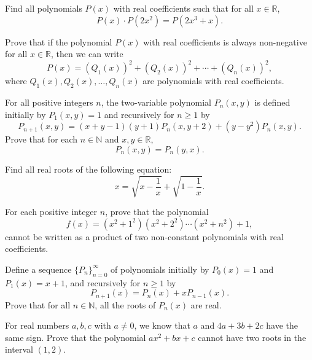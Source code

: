 \begin{question}[name={1979 Bulgaria}]
    Find all polynomials $P(x)$ with real coefficients such that for all $x \in\mathbb R$,
    \[P(x) \cdot P(2x^2) = P(2x^3+x).\]
\end{question}


\begin{question}[name={1979 Hungary}]
    Prove that if the polynomial $P(x)$ with real coefficients is always non-negative for all $x\in\mathbb R$, then we can write
    \[P(x) = (Q_1(x))^2+(Q_2(x))^2+\cdots+(Q_n(x))^2,\]
    where $Q_1(x), Q_2(x), \dots, Q_n(x)$ are polynomials with real coefficients.
\end{question}


\begin{question}[name={1998 Bulgaria}]
    For all positive integers $n$, the two-variable polynomial $P_n(x,y)$ is defined initially by $P_1(x,y)=1$ and recursively for $n\geq 1$ by
    \[P_{n+1}(x,y) = (x+y-1)(y+1)P_n(x,y+2) + (y-y^2)P_n(x,y).\]
    Prove that for each $n\in\mathbb N$ and $x,y \in \mathbb R$,
    \[P_n(x,y) = P_n(y,x).\]
\end{question}



\begin{question}[name={1998 Canada}]
    Find all real roots of the following equation:
    \[x = \sqrt{x-\frac{1}{x}}+\sqrt{1-\frac{1}{x}}.\]
\end{question}

\begin{question}[name={1999 Japan}]
    For each positive integer $n$, prove that the polynomial
    \[f(x)=(x^2+1^2)(x^2+2^2)\cdots (x^2+n^2) + 1,\]
    cannot be written as a product of two non-constant polynomials with real coefficients.
\end{question}

\begin{question}
    Define a sequence $\{P_n\}_{n=0}^\infty$ of polynomials initially by $P_0(x)=1$ and $P_1(x)=x+1$, and recursively for $n \geq 1$ by
    \[P_{n+1}(x) = P_n(x) + xP_{n-1}(x).\]
    Prove that for all $n\in \mathbb N$, all the roots of $P_n(x)$ are real.
\end{question}



\begin{question}[name={1996 Romania}]
    For real numbers $a,b,c$ with $a\neq 0$, we know that $a$ and $4a+3b+2c$ have the same sign. Prove that the polynomial $ax^2+bx+c$ cannot have two roots in the interval $(1,2)$.
\end{question}



